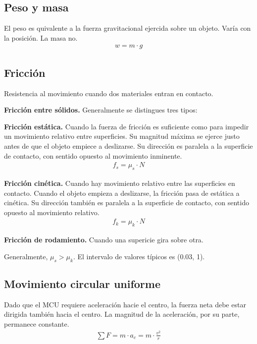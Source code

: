 \documentclass[12pt]{article}
\begin{document}
\subsection{Peso y masa}

El peso es quivalente a la fuerza gravitacional ejercida sobre un objeto.
Varía con la posición. La masa no.
\begin{align*}
  w = m\cdot g
\end{align*}

\subsection{Fricción}

Resistencia al movimiento cuando dos materiales entran en contacto.

\textbf{Fricción entre sólidos.}
Generalmente se distingues tres tipos:

\textbf{Fricción estática.}
Cuando la fuerza de fricción es suficiente como para impedir un movimiento
relativo entre superficies.
Su magnitud máxima se ejerce justo antes de que el objeto empiece a deslizarse.
Su dirección es paralela a la superficie de contacto,
con sentido opuesto al movimiento inminente.
\begin{align*}
  f_{s} = \mu_{s}\cdot N
\end{align*}

\textbf{Fricción cinética.}
Cuando hay movimiento relativo entre las superficies en contacto.
Cuando el objeto empieza a deslizarse, la fricción pasa de estática a cinética.
Su dirección también es paralela a la superficie de contacto,
con sentido opuesto al movimiento relativo.
\begin{align*}
  f_{k} = \mu_{k}\cdot N
\end{align*}

\textbf{Fricción de rodamiento.}
Cuando una supericie gira sobre otra.

Generalmente, \(\mu_{s} > \mu_{k}\).
El intervalo de valores típicos es (0.03, 1).

\subsection{Movimiento circular uniforme}

Dado que el MCU requiere aceleración hacie el centro,
la fuerza neta debe estar dirigida también hacia el centro.
La magnitud de la aceleración, por su parte, permanece constante.
\begin{align*}
  \sum F=m\cdot a_{c} = m \cdot \frac{v^{2}}{r}
\end{align*}
\end{document}
